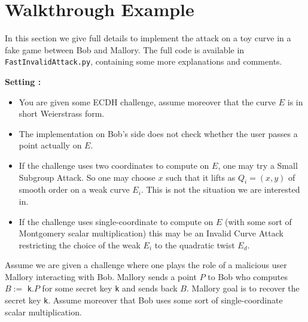 \documentclass[10pt]{article}
\theoremstyle{definition}
\begin{document}
\section{Walkthrough Example}

In this section we give full details to implement the attack on a toy curve in a fake game between Bob and Mallory.
The full code is available in \verb|FastInvalidAttack.py|, containing some more explanations and comments.

\vspace*{.5cm}
\textbf{Setting :} 
\begin{itemize}
\item You are given some ECDH challenge, assume moreover that the curve $E$ is in short Weierstrass form.
\item The implementation on Bob's side does not check whether the user passes a point actually on $E$.
\item If the challenge uses two coordinates to compute on $E$, one may try a Small Subgroup Attack.
So one may choose $x$ such that it lifts as $Q_i=(x,y)$ of smooth order on a weak curve $E_i$.
This is not the situation we are interested in.
\item If the challenge uses single-coordinate to compute on $E$ (with some sort of Montgomery scalar multiplication) this may be an Invalid Curve Attack restricting the choice of the weak $E_i$ to the quadratic twist $E_d$.
\end{itemize}

\noindent Assume we are given a challenge where one plays the role of a malicious user Mallory interacting with Bob.
Mallory sends a point $P$ to Bob who computes $B := $ \verb|k|$.P$ for some secret key \verb|k| and sends back $B$.
Mallory goal is to recover the secret key \verb|k|.
Assume moreover that Bob uses some sort of single-coordinate scalar multiplication.
\end{document}
